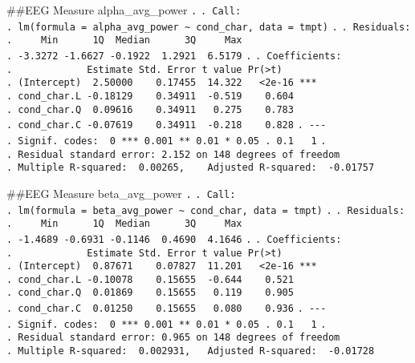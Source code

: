 \documentclass[
]{article}
\begin{document}
\#\#EEG Measure alpha\_avg\_power \texttt{.} \texttt{.\ Call:}
\texttt{.\ lm(formula\ =\ alpha\_avg\_power\ \textasciitilde{}\ cond\_char,\ data\ =\ tmpt)}
\texttt{.} \texttt{.\ Residuals:}
\texttt{.\ \ \ \ \ Min\ \ \ \ \ \ 1Q\ \ Median\ \ \ \ \ \ 3Q\ \ \ \ \ Max}
\texttt{.\ -3.3272\ -1.6627\ -0.1922\ \ 1.2921\ \ 6.5179} \texttt{.}
\texttt{.\ Coefficients:}
\texttt{.\ \ \ \ \ \ \ \ \ \ \ \ \ Estimate\ Std.\ Error\ t\ value\ Pr(\textgreater{}\textbar{}t\textbar{})}
\texttt{.\ (Intercept)\ \ 2.50000\ \ \ \ 0.17455\ \ 14.322\ \ \ \textless{}2e-16\ ***}
\texttt{.\ cond\_char.L\ -0.18129\ \ \ \ 0.34911\ \ -0.519\ \ \ \ 0.604}
\texttt{.\ cond\_char.Q\ \ 0.09616\ \ \ \ 0.34911\ \ \ 0.275\ \ \ \ 0.783}
\texttt{.\ cond\_char.C\ -0.07619\ \ \ \ 0.34911\ \ -0.218\ \ \ \ 0.828}
\texttt{.\ -\/-\/-}
\texttt{.\ Signif.\ codes:\ \ 0\ \textquotesingle{}***\textquotesingle{}\ 0.001\ \textquotesingle{}**\textquotesingle{}\ 0.01\ \textquotesingle{}*\textquotesingle{}\ 0.05\ \textquotesingle{}.\textquotesingle{}\ 0.1\ \textquotesingle{}\ \textquotesingle{}\ 1}
\texttt{.}
\texttt{.\ Residual\ standard\ error:\ 2.152\ on\ 148\ degrees\ of\ freedom}
\texttt{.\ Multiple\ R-squared:\ \ 0.00265,\ \ \ \ Adjusted\ R-squared:\ \ -0.01757}

\#\#EEG Measure beta\_avg\_power \texttt{.} \texttt{.\ Call:}
\texttt{.\ lm(formula\ =\ beta\_avg\_power\ \textasciitilde{}\ cond\_char,\ data\ =\ tmpt)}
\texttt{.} \texttt{.\ Residuals:}
\texttt{.\ \ \ \ \ Min\ \ \ \ \ \ 1Q\ \ Median\ \ \ \ \ \ 3Q\ \ \ \ \ Max}
\texttt{.\ -1.4689\ -0.6931\ -0.1146\ \ 0.4690\ \ 4.1646} \texttt{.}
\texttt{.\ Coefficients:}
\texttt{.\ \ \ \ \ \ \ \ \ \ \ \ \ Estimate\ Std.\ Error\ t\ value\ Pr(\textgreater{}\textbar{}t\textbar{})}
\texttt{.\ (Intercept)\ \ 0.87671\ \ \ \ 0.07827\ \ 11.201\ \ \ \textless{}2e-16\ ***}
\texttt{.\ cond\_char.L\ -0.10078\ \ \ \ 0.15655\ \ -0.644\ \ \ \ 0.521}
\texttt{.\ cond\_char.Q\ \ 0.01869\ \ \ \ 0.15655\ \ \ 0.119\ \ \ \ 0.905}
\texttt{.\ cond\_char.C\ \ 0.01250\ \ \ \ 0.15655\ \ \ 0.080\ \ \ \ 0.936}
\texttt{.\ -\/-\/-}
\texttt{.\ Signif.\ codes:\ \ 0\ \textquotesingle{}***\textquotesingle{}\ 0.001\ \textquotesingle{}**\textquotesingle{}\ 0.01\ \textquotesingle{}*\textquotesingle{}\ 0.05\ \textquotesingle{}.\textquotesingle{}\ 0.1\ \textquotesingle{}\ \textquotesingle{}\ 1}
\texttt{.}
\texttt{.\ Residual\ standard\ error:\ 0.965\ on\ 148\ degrees\ of\ freedom}
\texttt{.\ Multiple\ R-squared:\ \ 0.002931,\ \ \ Adjusted\ R-squared:\ \ -0.01728}
\end{document}
